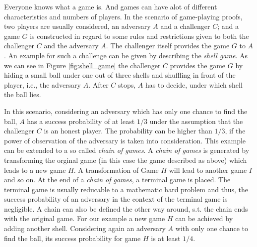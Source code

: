 Everyone knows what a game is. And games can have alot of different characteristics and numbers of players. In the scenario of game-playing proofs,
two players are usually considered, an adversary $A$ and a challenger $C$; and a game $G$ is constructed in regard to some rules and restrictions given
to both the challenger $C$ and the adversary $A$. The challenger itself provides the game $G$ to $A$. An example for such a challenge can be given by
describing the \textit{shell game}. As we can see in Figure \ref{fig:shell_game} the challenger $C$ provides the game $G$ by hiding a small ball under one out of
three shells and shuffling in front of the player, i.e., the adversary $A$. After $C$ stops, $A$ has to decide, under which shell the ball lies.


In this scenario, considering an adversary which has only one chance to find the ball, $A$ has a success probability of at least $1/3$ under the assumption
that the challenger $C$ is an honest player. The probability can be higher than $1/3$, if the power of observation of the adversary is taken into consideration.
This example can be extended to a so called \textit{chain of games}. A \textit{chain of games} is generated by transforming the orginal game (in this case the
game described as above) which leads to a new game $H$. A transformation of Game $H$ will lead to another game $I$ and so on. At the end of a \textit{chain of games},
a terminal game is placed. The terminal game is usually reducable to a mathematic hard problem and thus, the success probability of an adversary in the context
of the terminal game is negligible. A chain can also be defined the other way around, s.t. the chain ends with the original game.
For our example a new game $H$ can be achieved by adding another shell. Considering again an adversary $A$ with only one chance to find the ball,
its success probability for game $H$ is at least $1/4$.

